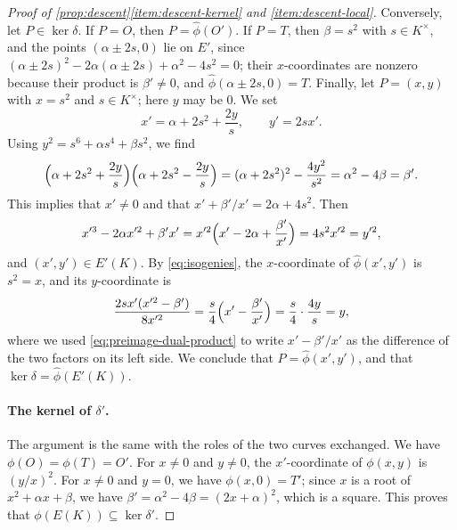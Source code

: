 \documentclass[12pt,oneside,openany]{book}
\theoremstyle{definition}
\theoremstyle{plain}
\numberwithin{equation}{chapter}
\theoremstyle{plain}
\theoremstyle{definition}
\theoremstyle{remark}
\newcommand{\dual}{\hat\phi}
\begin{document}
\begin{proof}[Proof of \cref{prop:descent}\ref{item:descent-kernel} and \ref{item:descent-local}]
Conversely, let $P\in\ker\delta$. If $P=O$, then $P=\dual(O')$. If $P=T$, then $\beta=s^2$ with $s\in K^\times$, and the points $(\alpha\pm2s,0)$ lie on $E'$, since $(\alpha\pm2s)^2-2\alpha(\alpha\pm2s)+\alpha^2-4s^2=0$; their $x$-coordinates are nonzero because their product is $\beta'\ne0$, and $\dual(\alpha\pm2s,0)=T$. Finally, let $P=(x,y)$ with $x=s^2$ and $s\in K^\times$; here $y$ may be $0$. We set
\begin{equation}\label{eq:preimage-dual}
x'=\alpha+2s^2+\frac{2y}{s},\qquad y'=2sx'.
\end{equation}
Using $y^2=s^6+\alpha s^4+\beta s^2$, we find
\begin{equation}\label{eq:preimage-dual-product}
\Bigl(\alpha+2s^2+\frac{2y}s\Bigr)\Bigl(\alpha+2s^2-\frac{2y}s\Bigr)=(\alpha+2s^2)^2-\frac{4y^2}{s^2}=\alpha^2-4\beta=\beta'.
\end{equation}
This implies that $x'\ne0$ and that $x'+\beta'/x'=2\alpha+4s^2$. Then
\begin{equation}
x'^3-2\alpha x'^2+\beta'x'=x'^2\Bigl(x'-2\alpha+\frac{\beta'}{x'}\Bigr)=4s^2x'^2=y'^2,
\end{equation}
and $(x',y')\in E'(K)$. By \eqref{eq:isogenies}, the $x$-coordinate of $\dual(x',y')$ is $s^2=x$, and its $y$-coordinate is
\begin{equation}
\frac{2sx'(x'^2-\beta')}{8x'^2}=\frac s4\Bigl(x'-\frac{\beta'}{x'}\Bigr)=\frac s4\cdot\frac{4y}s=y,
\end{equation}
where we used \eqref{eq:preimage-dual-product} to write $x'-\beta'/x'$ as the difference of the two factors on its left side. We conclude that $P=\dual(x',y')$, and that $\ker\delta=\dual(E'(K))$.

\paragraph{The kernel of $\delta'$.} The argument is the same with the roles of the two curves exchanged. We have $\phi(O)=\phi(T)=O'$. For $x\ne0$ and $y\ne0$, the $x'$-coordinate of $\phi(x,y)$ is $(y/x)^2$. For $x\ne0$ and $y=0$, we have $\phi(x,0)=T'$; since $x$ is a root of $x^2+\alpha x+\beta$, we have $\beta'=\alpha^2-4\beta=(2x+\alpha)^2$, which is a square. This proves that $\phi(E(K))\subseteq\ker\delta'$.


\end{proof}
\end{document}
